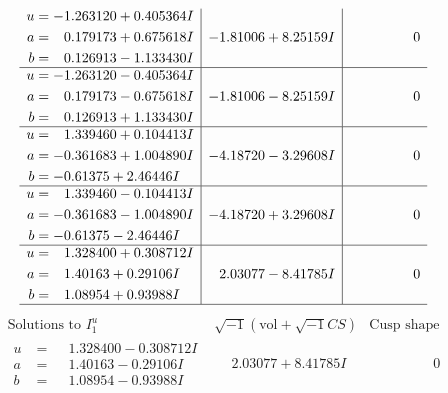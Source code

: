 \documentclass[1p]{elsarticle_modified}
\theoremstyle{definition}
\newcommand{\I}{\sqrt{-1}}
\begin{document}
$$\begin{array}{c|c|c}
\begin{aligned}
u &= -1.263120 + 0.405364 I \\
a &= \phantom{-}0.179173 + 0.675618 I \\
b &= \phantom{-}0.126913 - 1.133430 I\end{aligned}
 & -1.81006 + 8.25159 I & \phantom{-0.000000 } 0 \\ \hline\begin{aligned}
u &= -1.263120 - 0.405364 I \\
a &= \phantom{-}0.179173 - 0.675618 I \\
b &= \phantom{-}0.126913 + 1.133430 I\end{aligned}
 & -1.81006 - 8.25159 I & \phantom{-0.000000 } 0 \\ \hline\begin{aligned}
u &= \phantom{-}1.339460 + 0.104413 I \\
a &= -0.361683 + 1.004890 I \\
b &= -0.61375 + 2.46446 I\end{aligned}
 & -4.18720 - 3.29608 I & \phantom{-0.000000 } 0 \\ \hline\begin{aligned}
u &= \phantom{-}1.339460 - 0.104413 I \\
a &= -0.361683 - 1.004890 I \\
b &= -0.61375 - 2.46446 I\end{aligned}
 & -4.18720 + 3.29608 I & \phantom{-0.000000 } 0 \\ \hline\begin{aligned}
u &= \phantom{-}1.328400 + 0.308712 I \\
a &= \phantom{-}1.40163 + 0.29106 I \\
b &= \phantom{-}1.08954 + 0.93988 I\end{aligned}
 & \phantom{-}2.03077 - 8.41785 I & \phantom{-0.000000 } 0\\
 \hline 
 \end{array}$$\newpage$$\begin{array}{c|c|c}  
\text{Solutions to }I^u_{1}& \I (\text{vol} + \sqrt{-1}CS) & \text{Cusp shape}\\
 \hline 
\begin{aligned}
u &= \phantom{-}1.328400 - 0.308712 I \\
a &= \phantom{-}1.40163 - 0.29106 I \\
b &= \phantom{-}1.08954 - 0.93988 I\end{aligned}
 & \phantom{-}2.03077 + 8.41785 I & \phantom{-0.000000 } 0 \\ \hline\begin{aligned}

\end{aligned}
\end{array}$$
\end{document}
